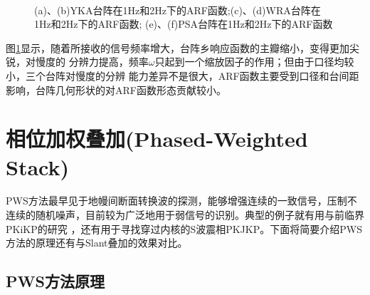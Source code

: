 \begin{figure}[tbph]
{}
\hfill{}\\
\hfill{}
\hfill{}
\hfill{}
\caption{(a)、(b)YKA台阵在1Hz和2Hz下的ARF函数;(c)、(d)WRA台阵在1Hz和2Hz下的ARF函数;%
(e)、(f)PSA台阵在1Hz和2Hz下的ARF函数}
\label{freq}
\end{figure}

图\ref{freq}显示，随着所接收的信号频率增大，台阵乡响应函数的主瓣缩小，变得更加尖锐，对慢度的
分辨力提高，频率$\omega$只起到一个缩放因子的作用；但由于口径均较小，三个台阵对慢度的分辨
能力差异不是很大，ARF函数主要受到口径和台间距影响，台阵几何形状的对ARF函数形态贡献较小。


\section{相位加权叠加(Phased-Weighted Stack)}

PWS方法最早见于地幔间断面转换波的探测\citep{Schimmel1997}，能够增强连续的一致信号，压制不连续的随机噪声，目前较为广泛地用于弱信号的识别。典型的例子就有用与前临界PKiKP的研究
\citep{Koper2003,Koper2004}，还有用于寻找穿过内核的S波震相PKJKP\citep{Deuss2000}。下面将简要介绍PWS方法的原理还有与Slant叠加的效果对比。

\subsection{PWS方法原理}

